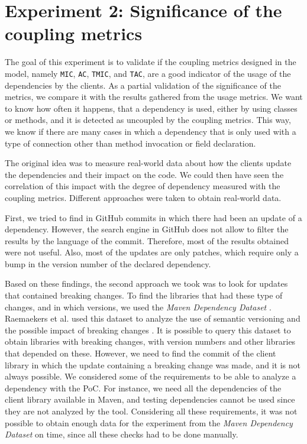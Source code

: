 
\section{Experiment 2: Significance of the coupling metrics}

The goal of this experiment is to validate if the coupling metrics designed in the model, namely \texttt{MIC}, \texttt{AC}, \texttt{TMIC}, and \texttt{TAC}, are a good indicator of the usage of the dependencies by the clients. As a partial validation of the significance of the metrics, we compare it with the results gathered from the usage metrics. We want to know how often it happens, that a dependency is used, either by using classes or methods, and it is detected as uncoupled by the coupling metrics. This way, we know if there are many cases in which a dependency that is only used with a type of connection other than method invocation or field declaration.


The original idea was to measure real-world data about how the clients update the dependencies and their impact on the code. We could then have seen the correlation of this impact with the degree of dependency measured with the coupling metrics. Different approaches were taken to obtain real-world data.

First, we tried to find in GitHub commits in which there had been an update of a dependency. However, the search engine in GitHub does not allow to filter the results by the language of the commit. Therefore, most of the results obtained were not useful. Also, most of the updates are only patches, which require only a bump in the version number of the declared dependency.

Based on these findings, the second approach we took was to look for updates that contained breaking changes. To find the libraries that had these type of changes, and in which versions, we used the \textit{Maven Dependency Dataset} \cite{Raemaekers2013}. Raemaekers et al. used this dataset to analyze the use of semantic versioning and the possible impact of breaking changes \cite{Raemaekers2017}. It is possible to query this dataset to obtain libraries with breaking changes, with version numbers and other libraries that depended on these. However, we need to find the commit of the client library in which the update containing a breaking change was made, and it is not always possible. We considered some of the requirements to be able to analyze a dependency with the PoC. For instance, we need all the dependencies of the client library available in Maven, and testing dependencies cannot be used since they are not analyzed by the tool. Considering all these requirements, it was not possible to obtain enough data for the experiment from the \textit{Maven Dependency Dataset} on time, since all these checks had to be done manually.

